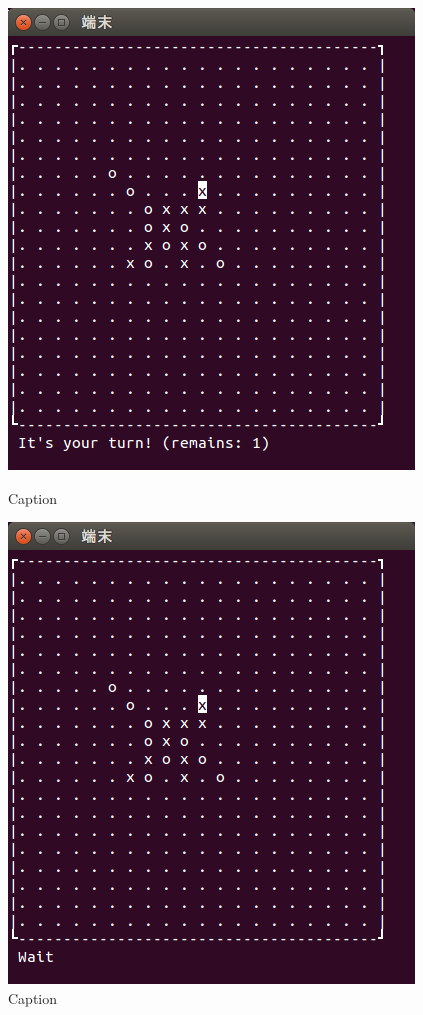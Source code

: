 \documentclass[a4j, titlepage, 10pt]{jsarticle}
\begin{document}
\begin{figure}[H]
  \begin{minipage}{0.5\hsize}
    \centering
    \includegraphics[scale=0.5]{img/fin-prev1-1.png}
    \caption{Caption}
    \label{fig:fin-prev1-1.png}
  \end{minipage}
  \begin{minipage}{0.5\hsize}
    \includegraphics[scale=0.5]{img/fin-prev1-2.png}
    \caption{Caption}
    \label{fig:fin-prev1-2.png}
  \end{minipage}
\end{figure}
\end{document}
